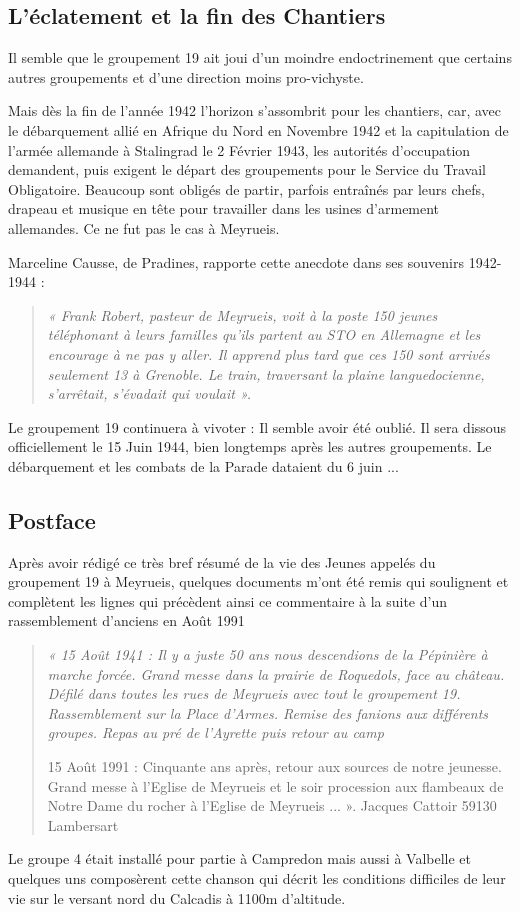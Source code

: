 
\subsection*{L’éclatement et la fin des Chantiers}

Il semble que le groupement 19 ait joui d’un moindre endoctrinement que certains
autres groupements et d’une direction moins pro-vichyste.

Mais dès la fin de l’année 1942 l’horizon s’assombrit pour les chantiers, car, avec le
débarquement allié en Afrique du Nord en Novembre 1942 et la capitulation de
l’armée allemande à Stalingrad le 2 Février 1943, les autorités d’occupation
demandent, puis exigent le départ des groupements pour le Service du Travail
Obligatoire. Beaucoup sont obligés de partir, parfois entraînés par leurs chefs,
drapeau et musique en tête pour travailler dans les usines d’armement allemandes. Ce
ne fut pas le cas à Meyrueis.

Marceline Causse, de Pradines, rapporte cette anecdote dans ses souvenirs 1942-
1944 :

\begin{quote}\itshape
« Frank Robert, pasteur de Meyrueis, voit à la poste 150 jeunes téléphonant à leurs familles qu’ils
partent au STO en Allemagne et les encourage à ne pas y aller. Il apprend plus tard que ces 150 sont
arrivés seulement 13 à Grenoble. Le train, traversant la plaine languedocienne, s’arrêtait, s’évadait
qui voulait ».
\end{quote}

Le groupement 19 continuera à vivoter : Il semble avoir été oublié. Il sera dissous
officiellement le 15 Juin 1944, bien longtemps après les autres groupements. Le
débarquement et les combats de la Parade dataient du 6 juin ...

\subsection*{Postface}

Après avoir rédigé ce très bref résumé de la vie des Jeunes appelés du groupement 19
à Meyrueis, quelques documents m’ont été remis qui soulignent et complètent les
lignes qui précèdent ainsi ce commentaire à la suite d’un rassemblement d’anciens
en Août 1991

\begin{quote}\itshape
« 15 Août 1941 : Il y a juste 50 ans nous descendions de la Pépinière à marche
forcée. Grand messe dans la prairie de Roquedols, face au château. Défilé dans
toutes les rues de Meyrueis avec tout le groupement 19. Rassemblement sur la Place
d’Armes. Remise des fanions aux différents groupes. Repas au pré de l’Ayrette puis
retour au camp

15 Août 1991 : Cinquante ans après, retour aux sources de notre jeunesse. Grand
messe à l’Eglise de Meyrueis et le soir procession aux flambeaux de Notre Dame du
rocher à l’Eglise de Meyrueis ... ». Jacques Cattoir 59130 Lambersart
\end{quote}

Le groupe 4 était installé pour partie à Campredon mais aussi à Valbelle et quelques
uns composèrent cette chanson qui décrit les conditions difficiles de leur vie sur le
versant nord du Calcadis à 1100m d’altitude.
